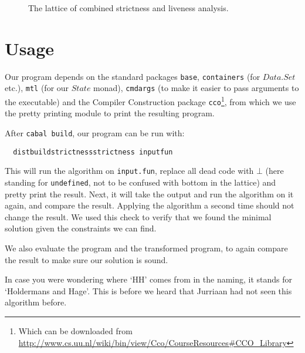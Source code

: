 \documentclass[a4paper,11pt]{article}
\newcommand{\Conid}[1]{\mathit{#1}}
\begin{document}
  \begin{figure}[h]
    \begin{center}
    \end{center}
    \caption{The lattice of combined strictness and liveness analysis.}
    \label{fig:strictlive}
  \end{figure}

\section{Usage}
  Our program depends on the standard packages {\tt base}, {\tt containers}
  (for \ensuremath{\Conid{\Conid{Data}.Set}} etc.), {\tt mtl} (for our \ensuremath{\Conid{State}} monad), {\tt cmdargs} (to
  make it easier to pass arguments to the executable) and the Compiler
  Construction package {\tt cco}\footnote{Which can be downloaded from \url{
  http://www.cs.uu.nl/wiki/bin/view/Cco/CourseResources\#CCO\_Library}}, from
  which we use the pretty printing module to print the resulting program.
  
  After {\tt cabal build}, our program can be run with:
  \begin{tabbing}\tt
~distbuildstrictnessstrictness~inputfun
\end{tabbing}
  This will run the algorithm on {\tt input.fun}, replace all dead code with
  \ensuremath{\bot } (here standing for {\tt undefined}, not to be confused with
  bottom in the lattice) and pretty print the result. Next, it will take the
  output and run the algorithm on it again, and compare the result. Applying
  the algorithm a second time should not change the result. We used this check
  to verify that we found the minimal solution given the constraints we can
  find.

  We also evaluate the program and the transformed program, to again compare
  the result to make sure our solution is sound.

  In case you were wondering where `HH' comes from in the naming, it stands
  for `Holdermans and Hage'. This is before we heard that Jurriaan had not
  seen this algorithm before.
\end{document}
